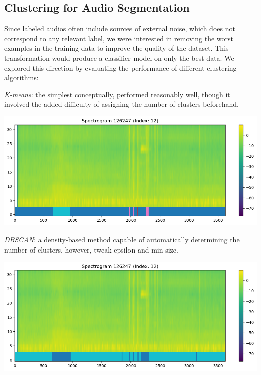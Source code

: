 \documentclass[10pt]{article}
\begin{document}
\subsection*{Clustering for Audio Segmentation}

Since labeled audios often include sources of external noise, which does not correspond to any relevant label, we were interested in removing the worst examples in the training data to improve the quality of the dataset. This transformation would produce a classifier model on only the best data. We explored this direction by evaluating the performance of different clustering algorithms:

\begin{minipage}{0.6\linewidth}
\textit{K-means}: the simplest conceptually, performed reasonably well, though it involved the added difficulty of assigning the number of clusters beforehand.
\end{minipage}
\hfill
\begin{minipage}{0.35\linewidth}
  \includegraphics[width=\linewidth]{img/train_spectrogram_12_kmeans.png}
\end{minipage}

\vspace{1em}

\begin{minipage}{0.6\linewidth}
\textit{DBSCAN}: a density-based method capable of automatically determining the number of clusters, however, tweak epsilon and min size.
\end{minipage}
\hfill
\begin{minipage}{0.35\linewidth}
  \includegraphics[width=\linewidth]{img/train_spectrogram_12_dbscan.png}
\end{minipage}
\end{document}
